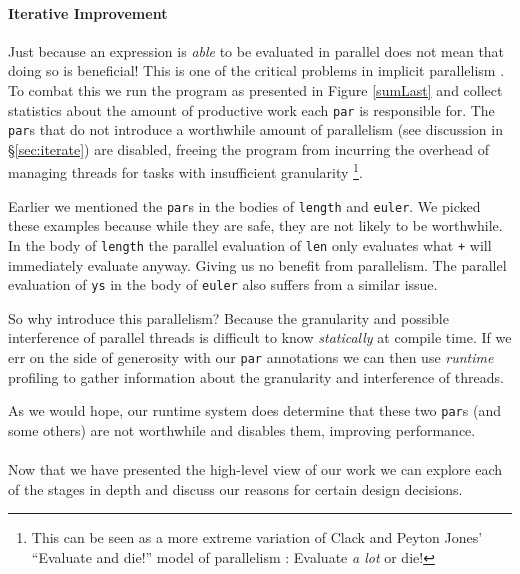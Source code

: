 \paragraph{Iterative Improvement}

Just because an expression is \emph{able} to be evaluated in parallel does not
mean that doing so is beneficial! This is one of the critical problems in
implicit parallelism \citep{hogen1992automatic, hammond2000research,
Jones2009Tuning}. To combat this we run the program as presented in Figure
\ref{sumLast} and collect statistics about the amount of productive work
each \verb-par- is responsible for. The \verb-par-s that do not introduce
a worthwhile amount of parallelism (see discussion in \S\ref{sec:iterate})
are disabled, freeing the program from incurring the overhead of managing
threads for tasks with insufficient granularity \footnote{This can be seen
as a more extreme variation of Clack and Peyton Jones' ``Evaluate and die!''
model of parallelism \citep{clack1986four}: Evaluate \emph{a lot} or die!}.

Earlier we mentioned the \verb-par-s in the bodies of \verb-length- and
\verb-euler-. We picked these examples because while they are safe, they are
not likely to be worthwhile. In the body of \verb-length- the parallel
evaluation of \verb-len- only evaluates what \verb-+- will immediately evaluate
anyway. Giving us no benefit from parallelism. The parallel evaluation of
\verb-ys- in the body of \verb-euler- also suffers from a similar issue.

So why introduce this parallelism? Because the granularity and possible
interference of parallel threads is difficult to know \emph{statically} at
compile time. If we err on the side of generosity with our \verb-par-
annotations we can then use \emph{runtime} profiling to gather information
about the granularity and interference of threads. 

As we would hope, our runtime system does determine that these two \verb-par-s (and some
others) are not worthwhile and disables them, improving performance.

\paragraph{}

Now that we have presented the high-level view of our work we can explore each of
the stages in depth and discuss our reasons for certain design decisions.
